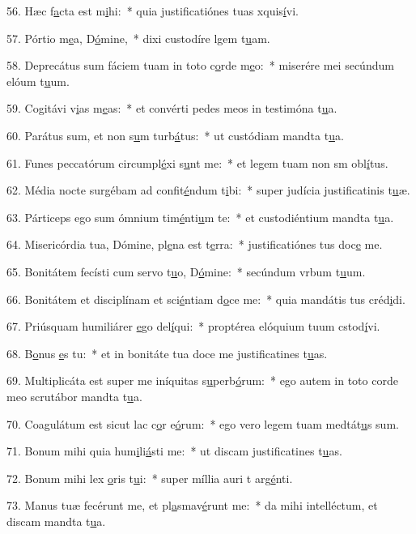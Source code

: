 56. Hæc f\uline{a}cta est m\uline{i}hi:~* quia justificatiónes tuas xquis\uline{í}vi.\par 
57. Pórtio m\uline{e}a, D\uline{ó}mine,~* dixi custodíre lgem t\uline{u}am.\par 
58. Deprecátus sum fáciem tuam in toto c\uline{o}rde m\uline{e}o:~* miserére mei secúndum elóum t\uline{u}um.\par 
59. Cogitávi v\uline{i}as m\uline{e}as:~* et convérti pedes meos in testimóna t\uline{u}a.\par 
60. Parátus sum, et non s\uline{u}m turb\uline{á}tus:~* ut custódiam mandta t\uline{u}a.\par 
61. Funes peccatórum circumpl\uline{é}xi s\uline{u}nt me:~* et legem tuam non sm obl\uline{í}tus.\par 
62. Média nocte surgébam ad confit\uline{é}ndum t\uline{i}bi:~* super judícia justificatinis t\uline{u}æ.\par 
63. Párticeps ego sum ómnium tim\uline{é}nti\uline{u}m te:~* et custodiéntium mandta t\uline{u}a.\par 
64. Misericórdia tua, Dómine, pl\uline{e}na est t\uline{e}rra:~* justificatiónes tus doc\uline{e} me.\par 
65. Bonitátem fecísti cum servo t\uline{u}o, D\uline{ó}mine:~* secúndum vrbum t\uline{u}um.\par 
66. Bonitátem et disciplínam et sci\uline{é}ntiam d\uline{o}ce me:~* quia mandátis tus créd\uline{i}di.\par 
67. Priúsquam humiliárer \uline{e}go del\uline{í}qui:~* proptérea elóquium tuum cstod\uline{í}vi.\par 
68. B\uline{o}nus \uline{e}s tu:~* et in bonitáte tua doce me justificatines t\uline{u}as.\par 
69. Multiplicáta est super me iníquitas s\uline{u}perb\uline{ó}rum:~* ego autem in toto corde meo scrutábor mandta t\uline{u}a.\par 
70. Coagulátum est sicut lac c\uline{o}r e\uline{ó}rum:~* ego vero legem tuam medtát\uline{u}s sum.\par 
71. Bonum mihi quia hum\uline{i}li\uline{á}sti me:~* ut discam justificatines t\uline{u}as.\par 
72. Bonum mihi lex \uline{o}ris t\uline{u}i:~* super míllia auri t arg\uline{é}nti.\par 
73. Manus tuæ fecérunt me, et pl\uline{a}smav\uline{é}runt me:~* da mihi intelléctum, et discam mandta t\uline{u}a.\par 
